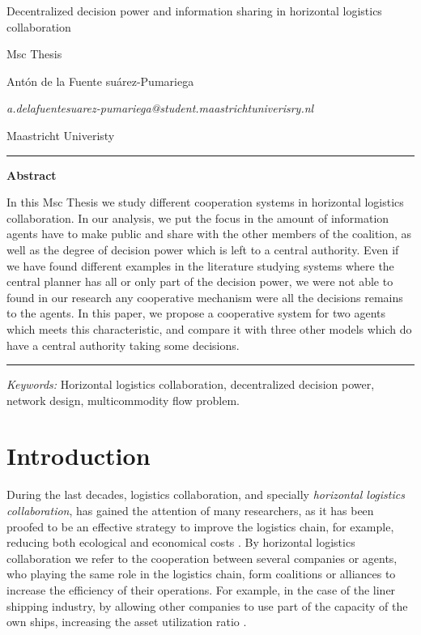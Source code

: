 \documentclass{article}
\begin{document}

\begin{center}

{\Large Decentralized decision power and information sharing in horizontal logistics collaboration} \\\medskip

Msc Thesis
\bigskip

Antón de la Fuente suárez-Pumariega
\medskip

\textit{a.delafuentesuarez-pumariega@student.maastrichtuniverisry.nl}
\bigskip

Maastricht Univeristy
\end{center}
\vspace{1cm}

\hrule
\medskip


\noindent\textbf{Abstract}
\medskip

\noindent In this Msc Thesis we study different cooperation systems in horizontal logistics collaboration. In our analysis, we put the focus in the amount of information agents have to make public and share with the other members of the coalition, as well as the degree of decision power which is left to a central authority. Even if we have found different examples in the literature studying systems where the central planner has all or only part of the decision power, we were not able to found in our research any cooperative mechanism were all the decisions remains to the agents. In this paper, we propose a cooperative system for two agents which meets this characteristic, and compare it with three other models which do have a central authority taking some decisions.
\bigskip
\hrule
\bigskip

\textit{Keywords:} Horizontal logistics collaboration, decentralized decision power, network design, multicommodity flow problem.

\section{Introduction}

During the last decades, logistics collaboration, and specially \emph{horizontal
logistics collaboration}, has gained the attention of many researchers, as it
has been proofed to be an effective strategy to improve the logistics chain, for
example, reducing both ecological and economical 
costs \parencite{BALLOT2010,SOYSAL2018168}. By horizontal logistics collaboration we refer to the
cooperation between several companies or agents, who playing the same role in
the logistics chain, form coalitions or alliances to increase the efficiency of
their operations. For example, in the case of the liner shipping
industry, by allowing other companies to use part of the capacity of the own
ships, increasing the asset utilization ratio \parencite{AGARWAL2008175}.
\end{document}
